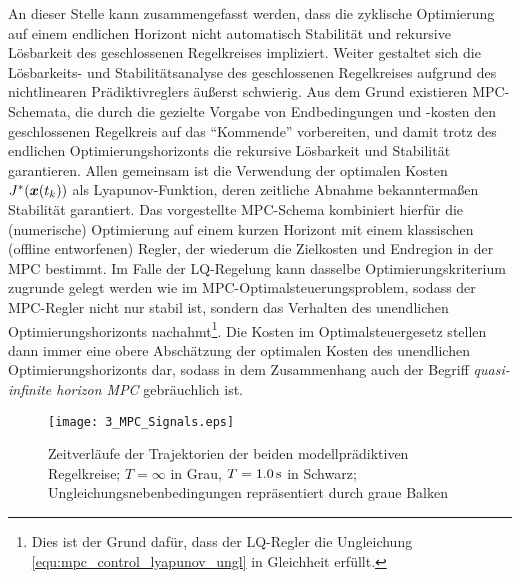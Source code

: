 An dieser Stelle kann zusammengefasst werden, dass die zyklische Optimierung auf einem endlichen Horizont nicht automatisch Stabilität und rekursive Lösbarkeit des geschlossenen Regelkreises impliziert. 
Weiter gestaltet sich die Lösbarkeits- und Stabilitätsanalyse des geschlossenen Regelkreises aufgrund des \iA nichtlinearen Prädiktivreglers äußerst schwierig. Aus dem Grund existieren MPC-Schemata, die durch die gezielte Vorgabe von Endbedingungen und -kosten den geschlossenen Regelkreis auf das "`Kommende"' vorbereiten, und damit trotz des endlichen Optimierungshorizonts die rekursive Lösbarkeit und Stabilität garantieren. Allen gemeinsam ist die Verwendung der optimalen Kosten $J^\ast(\boldsymbol{x}(t_k))$ als Lyapunov-Funktion, deren zeitliche Abnahme bekanntermaßen Stabilität garantiert.
Das vorgestellte MPC-Schema kombiniert hierfür die (numerische) Optimierung auf einem kurzen Horizont mit einem klassischen (offline entworfenen) Regler, der wiederum die Zielkosten und Endregion in der MPC bestimmt. Im Falle der LQ-Regelung kann dasselbe Optimierungskriterium zugrunde gelegt werden wie im MPC-Optimalsteuerungsproblem, sodass der MPC-Regler nicht nur stabil ist, sondern das Verhalten des unendlichen Optimierungshorizonts nachahmt\footnote{Dies ist der Grund dafür, dass der LQ-Regler die Ungleichung \eqref{equ:mpc_control_lyapunov_ungl} in Gleichheit erfüllt.}. Die Kosten im Optimalsteuergesetz stellen dann immer eine obere Abschätzung der optimalen Kosten des unendlichen Optimierungshorizonts dar, sodass in dem Zusammenhang auch der Begriff \emph{quasi-infinite horizon MPC} \cite{Findeisen2002} gebräuchlich ist.

\begin{figure}[ht]
	\centering
	
	\renewcommand{\matlabtextA}{\scriptsize}	
	\def\xlabel{$t,\tau$ in $\unit{s}$}	
	\def\ylabelA{$u$ in $\unitfrac{m}{s^3}$}	
	\def\ylabelB{$a_\text{ego}$ in $\unitfrac{m}{s^2}$}		
	\def\ylabelC{$\Delta v$ in $\unitfrac{m}{s}$}	
	\def\ylabelD{$\Delta x$ in $\unit{m}$}		
  \texttt{[image: 3\_MPC\_Signals.eps]}
    \caption[Trajektorienzeitverläufe der modellprädiktiven Regelkreise]{Zeitverläufe der Trajektorien der beiden modellprädiktiven Regelkreise; $T=\infty$ in Grau, $T=\unit[1.0]{s}$ in Schwarz; Ungleichungsnebenbedingungen repräsentiert durch graue Balken}
    \label{fig:MPC_Signals}
	\end{figure}
  




